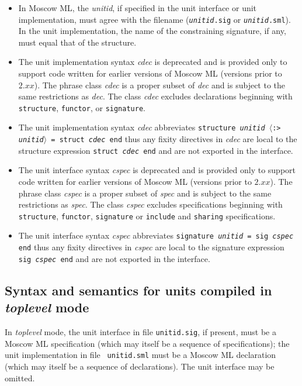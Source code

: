 \documentclass[fleqn,a4paper]{article}
\newcommand{\la}{$\langle$}
\newcommand{\ra}{$\rangle$}
\begin{document}
\begin{itemize}
\item In Moscow ML, the {\it unitid}, if specified in the unit interface
  or unit implementation, must agree with the filename ({\tt {\it unitid}.sig} or
  {\tt {\it unitid}.sml}). 
  In the unit implementation, the name of the
  constraining signature, if any, must equal that of the structure.

\item The unit implementation syntax {\it cdec} is deprecated and is provided only 
to support code written for earlier versions of Moscow ML  (versions prior 
to $2.xx$). The phrase class
{\it cdec} is a proper subset of {\it dec} and is subject to the same restrictions as {\it dec}. The class {\it cdec} excludes
  declarations beginning with {\tt structure}, {\tt functor}, or
  {\tt signature}.

\item The unit implementation syntax {\it cdec}  abbreviates 
{\tt structure {\it unitid\/} \la:> {\it unitid\/}\ra\ = struct {\it cdec\/} end} 
thus any fixity directives in {\it cdec} are
local to the structure expression
{\tt struct {\it cdec\/} end} and are not exported in the interface.

\item The unit interface syntax {\it cspec} is deprecated and is provided only 
to support code written for earlier versions of Moscow ML  (versions prior 
to $2.xx$). The phrase class
{\it cspec} is a proper subset of {\it spec} and is subject to the same restrictions as {\it spec}. 
The class {\it cspec} excludes
specifications beginning with {\tt structure}, {\tt functor}, {\tt signature}  or {\tt include} and {\tt sharing} specifications.

\item The unit interface syntax {\it cspec}  abbreviates
 {\tt signature {\it unitid\/} = sig {\it cspec\/} end}
thus any fixity directives in {\it cspec} are local to the signature expression 
{\tt sig {\it cspec\/} end} 
and are not exported in the interface.

\end{itemize}

\subsection{Syntax and semantics for units compiled in \emph{toplevel} mode}

In \emph{toplevel} mode, the unit interface in file {\tt unitid.sig},
if present, must be a Moscow ML specification (which may itself be a
sequence of specifications); the unit implementation in file {\tt
  unitid.sml} must be a Moscow ML declaration (which may itself be a
sequence of declarations).  The unit interface may be omitted.
\end{document}
